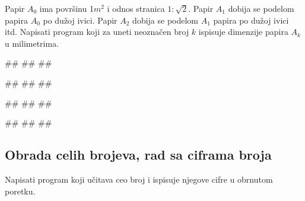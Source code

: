 \begin{Exercise}[difficulty=1, label=p1.7_] 
Papir $A_0$ ima povr\v sinu 1$m^2$ i odnos stranica
  $1:\sqrt{2}$. Papir $A_1$ dobija se podelom papira $A_0$ po dužoj
  ivici. Papir $A_2$ dobija se podelom $A_1$ papira po dužoj ivici
  itd. Napisati program koji za uneti neoznačen broj $k$ ispisuje
  dimenzije papira $A_k$ u milimetrima. 
  
\begin{miditest}
\begin{upotreba}{1}
#\naslovInt#
##
##
\end{upotreba}
\end{miditest}
\begin{miditest}
\begin{upotreba}{2}
#\naslovInt#
##
##
\end{upotreba}
\end{miditest}

\begin{miditest}
\begin{upotreba}{3}
#\naslovInt#
##
##
\end{upotreba}
\end{miditest}
\begin{miditest}
\begin{upotreba}{4}
#\naslovInt#
##
##
\end{upotreba}
\end{miditest}
\end{Exercise}
\begin{Answer}[ref=p1.7_]
\end{Answer}


\subsection{Obrada celih brojeva, rad sa ciframa broja}

\begin{Exercise}[label=v1.3_06] 
Napisati program koji učitava ceo broj i ispisuje njegove cifre u
obrnutom poretku.
\end{Exercise}
\begin{Answer}[ref=v1.3_06]
\end{Answer}


